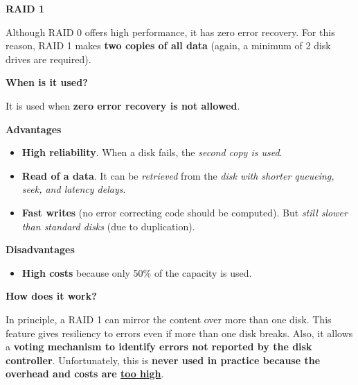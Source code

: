 \newpage

\begin{center}\label{RAID 1}
    \large
    \hypertarget{RAID 1}{\textcolor{Red2}{\textbf{RAID 1}}}
\end{center}

\noindent
Although RAID 0 offers high performance, it has zero error recovery. For this reason, RAID 1 makes \textbf{two copies of all data} (again, a minimum of 2 disk drives are required).

\begin{flushleft}
    \textcolor{Green3}{ \textbf{When is it used?}}
\end{flushleft}
It is used when \textbf{zero error recovery is not allowed}.

\highspace
\begin{flushleft}
    \textcolor{Green3}{ \textbf{Advantages}}
\end{flushleft}
\begin{itemize}
    \item \textbf{High reliability}. When a disk fails, the \emph{second copy is used}.
    \item \textbf{Read of a data}. It can be \emph{retrieved} from the \emph{disk with shorter queueing, seek, and latency delays}.
    \item \textbf{Fast writes} (no error correcting code should be computed). But \emph{still slower than standard disks} (due to duplication).
\end{itemize}

\highspace
\begin{flushleft}
    \textcolor{Red2}{ \textbf{Disadvantages}}
\end{flushleft}
\begin{itemize}
    \item \textbf{High costs} because only 50\% of the capacity is used.
\end{itemize}

\highspace
\begin{flushleft}
    \textcolor{Green3}{ \textbf{How does it work?}}
\end{flushleft}
In principle, a RAID 1 can mirror the content over more than one disk. This feature gives resiliency to errors even if more than one disk breaks. Also, it allows a \textbf{voting mechanism to identify errors not reported by the disk controller}. Unfortunately, this is \textbf{never used in practice because the overhead and costs are \underline{too high}}.

